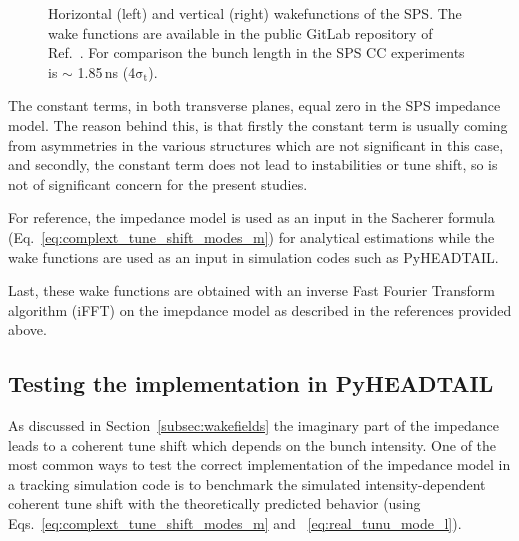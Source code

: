 \begin{figure}[!ht]
\begin{subfigure}[t]{0.45\textwidth}
    \end{subfigure}
    \hfill
     \caption{Horizontal (left) and vertical (right) wakefunctions of the SPS. The wake functions are available in the public GitLab repository of Ref.~\cite{sps_impedance_model_git}. For comparison the bunch length in the SPS CC experiments is $\sim$ 1.85\,ns (4$\mathrm{\sigma_t}$).} %
     \label{fig:sps_wakefunctions_model_H_V}
 \end{figure}

The constant terms, in both transverse planes, equal zero in the SPS impedance model. The reason behind this, is that firstly the constant term is usually coming from asymmetries in the various structures which are not significant in this case, and secondly, the constant term does not lead to instabilities or tune shift, so is not of significant concern for the present studies.

 For reference, the impedance model is used as an input in the Sacherer formula (Eq.~\eqref{eq:complext_tune_shift_modes_m}) for analytical estimations while the wake functions are used as an input in simulation codes such as PyHEADTAIL.

Last, these wake functions are obtained with an inverse Fast Fourier Transform algorithm (iFFT) on the imepdance model as described in the references provided above.



\subsection{Testing the implementation in PyHEADTAIL}\label{subsec:test_implementation_pyheatail}
As discussed in Section~\ref{subsec:wakefields} the imaginary part of the impedance leads to a coherent tune shift which depends on the bunch intensity. One of the most common ways to test the correct implementation of the impedance model in a tracking simulation code is to benchmark the simulated intensity-dependent coherent tune shift with the theoretically predicted behavior (using Eqs.~\eqref{eq:complext_tune_shift_modes_m} and ~\eqref{eq:real_tunu_mode_l}).

